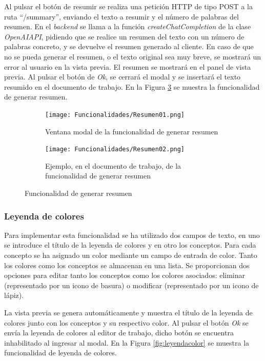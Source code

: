 Al pulsar el botón de resumir se realiza una petición HTTP de tipo POST a la ruta ``/summary'', enviando el texto a resumir y el número de palabras del resumen. En el \textit{backend} se llama a la función \textit{createChatCompletion} de la clase \textit{OpenAIAPI}, pidiendo que se realice un resumen del texto con un número de palabras concreto, y se devuelve el resumen generado al cliente. En caso de que no se pueda generar el resumen, o el texto original sea muy breve, se mostrará un error al usuario en la vista previa. El resumen se mostrará en el panel de vista previa. Al pulsar el botón de \textit{Ok}, se cerrará el modal y se insertará el texto resumido en el documento de trabajo. En la Figura \ref{fig:impresumen} se muestra la funcionalidad de generar resumen.

\begin{figure}[ht!]
  \centering
  \begin{subfigure}{\textwidth}
    \centering
    \texttt{[image: Funcionalidades/Resumen01.png]}
    \caption{Ventana modal de la funcionalidad de generar resumen}
    \label{fig:impresumen01}
  \end{subfigure}

  \begin{subfigure}{\textwidth}
    \centering
    \texttt{[image: Funcionalidades/Resumen02.png]}
    \caption{Ejemplo, en el documento de trabajo, de la funcionalidad de generar resumen}
    \label{fig:impresumen02}
  \end{subfigure}

  \caption{Funcionalidad de generar resumen}
  \label{fig:impresumen}
\end{figure}

\subsubsection{Leyenda de colores}
\label{sec:leyendaColores}
Para implementar esta funcionalidad se ha utilizado dos campos de texto, en uno se introduce el título de la leyenda de colores y en otro los conceptos. Para cada concepto se ha asignado un color mediante un campo de entrada de color. Tanto los colores como los conceptos se almacenan en una lista. Se proporcionan dos opciones para editar tanto los conceptos como los colores asociados: eliminar (representado por un icono de basura) o modificar (representado por un icono de lápiz).

La vista previa se genera automáticamente y muestra el título de la leyenda de colores junto con los conceptos y su respectivo color. Al pulsar el botón \textit{Ok} se envía la leyenda de colores al editor de trabajo, dicho botón se encuentra inhabilitado al ingresar al modal. En la Figura \ref{fig:leyendacolor} se muestra la funcionalidad de leyenda de colores.

